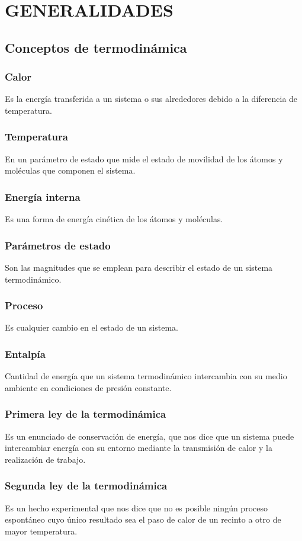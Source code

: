 \chapter{GENERALIDADES}

\section{Conceptos de termodinámica}

\subsection{Calor}
Es la energía transferida a un sistema o sus alrededores debido a la diferencia
de temperatura.
\subsection{Temperatura}
En un parámetro de estado que mide el estado de movilidad de los átomos y
moléculas que componen el sistema.
\subsection{Energía interna}
Es una forma de energía cinética de los átomos y moléculas.
\subsection{Parámetros de estado}
Son las magnitudes que se emplean para describir el estado de un sistema
termodinámico.
\subsection{Proceso}
Es cualquier cambio en el estado de un sistema.
\subsection{Entalpía}
Cantidad de energía que un sistema termodinámico intercambia con su medio
ambiente en condiciones de presión constante.
\subsection{Primera ley de la termodinámica}
Es un enunciado de conservación de energía, que nos dice que un sistema puede
intercambiar energía con su entorno mediante la transmisión de calor y la
realización de trabajo.
\subsection{Segunda ley de la termodinámica}
Es un hecho experimental que nos dice que no es posible ningún proceso
espontáneo cuyo único resultado sea el paso de calor de un recinto a otro de
mayor temperatura.
